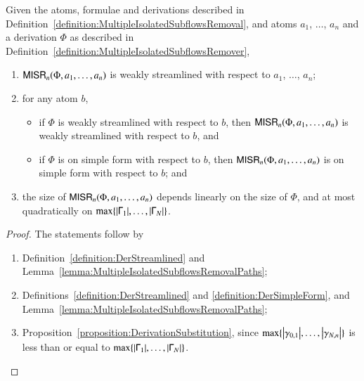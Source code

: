 \begin{proposition}\label{proposition:MultipleIsolatedSubflowRemover}
Given the atoms, formulae and derivations described in Definition~\vref{definition:MultipleIsolatedSubflowsRemoval}, and atoms $a_1$, $\dots$, $a_n$ and a derivation $\Phi$ as described in Definition~\ref{definition:MultipleIsolatedSubflowsRemover},
\begin{enumerate}
\item $\mathsf{MISR}_n(\Phi,a_1,\dots,a_n)$ is weakly streamlined with respect to $a_1$, $\dots$, $a_n$;
\item for any atom $b$,
\begin{itemize}
\item if $\Phi$ is weakly streamlined with respect to $b$, then $\mathsf{MISR}_n(\Phi,a_1,\dots,a_n)$ is weakly streamlined with respect to $b$, and
\item if $\Phi$ is on simple form with respect to $b$, then $\mathsf{MISR}_n(\Phi,a_1,\dots,a_n)$ is on simple form with respect to $b$; and
\end{itemize}
\item the size of $\mathsf{MISR}_n(\Phi,a_1,\dots,a_n)$ depends linearly on the size of\/ $\Phi$, and at most quadratically on $\max\{{\left\vert \mathsf\Gamma_1\right\vert},\dots,{\left\vert \mathsf\Gamma_N\right\vert}\}$.
\end{enumerate}
\end{proposition}

\begin{proof}
The statements follow by
\begin{enumerate}
\item Definition~\vref{definition:DerStreamlined} and Lemma~\vref{lemma:MultipleIsolatedSubflowsRemovalPaths};
\item Definitions~\ref{definition:DerStreamlined} and \ref{definition:DerSimpleForm}, and Lemma~\ref{lemma:MultipleIsolatedSubflowsRemovalPaths};
\item Proposition~\vref{proposition:DerivationSubstitution}, since $\max\{{\left\vert \gamma_{0,1}\right\vert},\dots,{\left\vert \gamma_{N,n}\right\vert}\}$ is less than or equal to $\max\{{\left\vert \mathsf\Gamma_1\right\vert},\dots,{\left\vert \mathsf\Gamma_N\right\vert}\}$.
\end{enumerate}
\end{proof}

